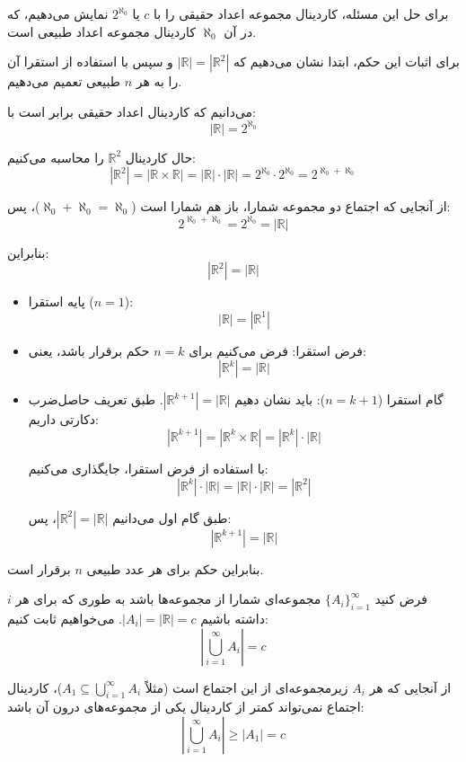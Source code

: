 برای حل این مسئله، کاردینال مجموعه اعداد حقیقی را با $c$ یا $2^{\aleph_0}$ نمایش می‌دهیم، که در آن $\aleph_0$ کاردینال مجموعه اعداد طبیعی است.



برای اثبات این حکم، ابتدا نشان می‌دهیم که $|\mathbb{R}| = |\mathbb{R}^2|$ و سپس با استفاده از استقرا آن را به هر $n$ طبیعی تعمیم می‌دهیم.

می‌دانیم که کاردینال اعداد حقیقی برابر است با:
\[ |\mathbb{R}| = 2^{\aleph_0} \]

حال کاردینال $\mathbb{R}^2$ را محاسبه می‌کنیم:
\[ |\mathbb{R}^2| = |\mathbb{R} \times \mathbb{R}| = |\mathbb{R}| \cdot |\mathbb{R}| = 2^{\aleph_0} \cdot 2^{\aleph_0} = 2^{\aleph_0 + \aleph_0} \]

از آنجایی که اجتماع دو مجموعه شمارا، باز هم شمارا است ($\aleph_0 + \aleph_0 = \aleph_0$)، پس:
\[ 2^{\aleph_0 + \aleph_0} = 2^{\aleph_0} = |\mathbb{R}| \]

بنابراین:
\[ |\mathbb{R}^2| = |\mathbb{R}| \]

\begin{itemize}
    \item {پایه استقرا ($n=1$):}
    \[ |\mathbb{R}| = |\mathbb{R}^1| \]
    
    \item {فرض استقرا:} فرض می‌کنیم برای $n=k$ حکم برقرار باشد، یعنی:
    \[ |\mathbb{R}^k| = |\mathbb{R}| \]
    
    \item {گام استقرا ($n=k+1$):} باید نشان دهیم $|\mathbb{R}^{k+1}| = |\mathbb{R}|$. طبق تعریف حاصل‌ضرب دکارتی داریم:
    \[ |\mathbb{R}^{k+1}| = |\mathbb{R}^k \times \mathbb{R}| = |\mathbb{R}^k| \cdot |\mathbb{R}| \]
    
    با استفاده از فرض استقرا، جایگذاری می‌کنیم:
    \[ |\mathbb{R}^k| \cdot |\mathbb{R}| = |\mathbb{R}| \cdot |\mathbb{R}| = |\mathbb{R}^2| \]
    
    طبق گام اول می‌دانیم $|\mathbb{R}^2| = |\mathbb{R}|$، پس:
    \[ |\mathbb{R}^{k+1}| = |\mathbb{R}| \]
\end{itemize}
بنابراین حکم برای هر عدد طبیعی $n$ برقرار است.

\newpage


فرض کنید $\{A_i\}_{i=1}^{\infty}$ مجموعه‌ای شمارا از مجموعه‌ها باشد به طوری که برای هر $i$ داشته باشیم $|A_i| = |\mathbb{R}| = c$. می‌خواهیم ثابت کنیم:
\[ \left| \bigcup_{i=1}^{\infty} A_i \right| = c \]


 از آنجایی که هر $A_i$ زیرمجموعه‌ای از این اجتماع است (مثلاً $A_1 \subseteq \bigcup_{i=1}^{\infty} A_i$)، کاردینال اجتماع نمی‌تواند کمتر از کاردینال یکی از مجموعه‌های درون آن باشد:
    \[ \left| \bigcup_{i=1}^{\infty} A_i \right| \ge |A_1| = c \]
    

